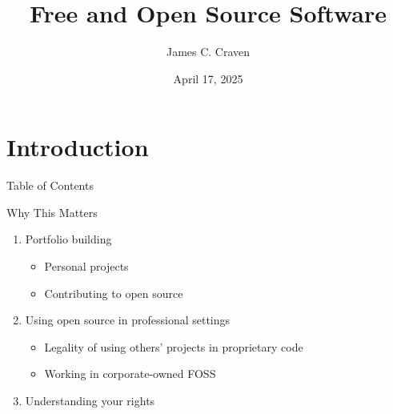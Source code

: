 \documentclass[9pt, dvipsnames]{beamer}
\title{Free and Open Source Software}
\author{James C. Craven}
\date{April 17, 2025}
\begin{document}
\maketitle

\section{Introduction}
\begin{frame}{Table of Contents}
    \tableofcontents
\end{frame}

\begin{frame}{Why This Matters}
    \begin{enumerate}
        \pause
        \item Portfolio building
            \begin{itemize}
                \item Personal projects
                \item Contributing to open source
            \end{itemize}
        \pause
        \item Using open source in professional settings
            \begin{itemize}
                \item Legality of using others' projects
                in proprietary code
                \item Working in corporate-owned FOSS
            \end{itemize}
        \pause
        \item Understanding your rights
    \end{enumerate}
\end{frame}
\end{document}
